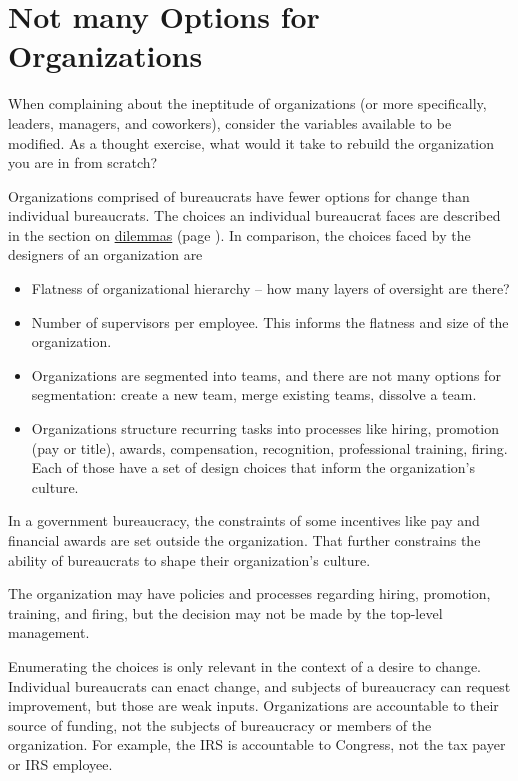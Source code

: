 \section{Not many Options for Organizations}

When complaining about the ineptitude of organizations (or more specifically, leaders, managers, and coworkers), consider the variables available to be modified. As a thought exercise, what would it take to rebuild the organization you are in from scratch? 

Organizations comprised of bureaucrats have fewer options for change than individual bureaucrats. The choices an individual bureaucrat faces are described in the section on \hyperref[sec:dilemma-trilemma]{dilemmas} (page \pageref{sec:dilemma-trilemma}).
In comparison, the choices faced by the designers of an organization are
\begin{itemize}
    \item Flatness of organizational hierarchy -- how many layers of oversight are there?
    \item Number of supervisors per employee. This informs the flatness and size of the organization.
    \item Organizations are segmented into teams, and there are not many options for segmentation: create a new team, merge existing teams, dissolve a team.
    \item Organizations structure recurring tasks into processes like hiring, promotion (pay or title), awards, compensation, recognition, professional training, firing. Each of those have a set of design choices that inform the organization's culture.
\end{itemize}
In a government bureaucracy, the constraints of some incentives like pay and financial awards are set outside the organization. That further constrains the ability of bureaucrats to shape their organization's culture.

The organization may have policies and processes regarding hiring, promotion, training, and firing, but the decision may not be made by the top-level management. 

Enumerating the choices is only relevant in the context of a desire to change. 
Individual bureaucrats can enact change, and subjects of bureaucracy can request improvement, but those are weak inputs. 
Organizations are accountable to their source of funding, not the subjects of bureaucracy or members of the organization. For example, the IRS is accountable to Congress, not the tax payer or IRS employee. 

